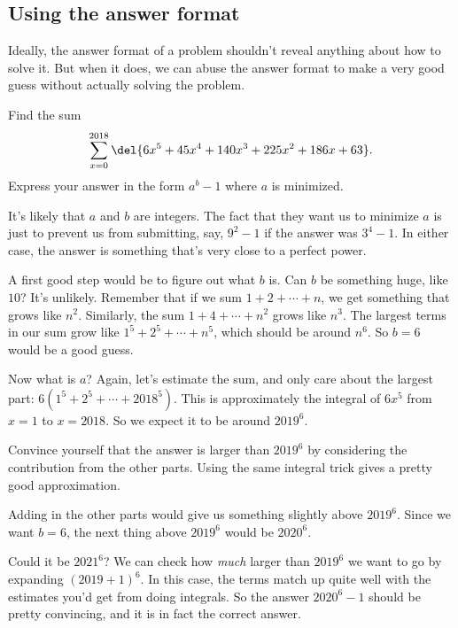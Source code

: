 \documentclass[11pt,paper=letter]{scrartcl}
\begin{document}
\subsection{Using the answer format}

Ideally, the answer format of a problem shouldn't reveal anything about how to solve it. But when it does, we can abuse the answer format to make a very good guess without actually solving the problem.

\begin{exboxed}
  \label{ex:sipnayan}
  Find the sum $$\displaystyle \sum_{x = 0}^{2018} \del{6x^5 + 45 x^4 + 140x^3 + 225 x^2 + 186x + 63}.$$ Express your answer in the form $a^b - 1$ where $a$ is minimized. %
\end{exboxed}

It's likely that $a$ and $b$ are integers. The fact that they want us to minimize $a$ is just to prevent us from submitting, say, $9^2 - 1$ if the answer was $3^4 - 1$. In either case, the answer is something that's very close to a perfect power.

A first good step would be to figure out what $b$ is. Can $b$ be something huge, like $10$? It's unlikely. Remember that if we sum $1 + 2 + \cdots + n$, we get something that grows like $n^2$. Similarly, the sum $1 + 4 + \cdots + n^2$ grows like $n^3$. The largest terms in our sum grow like $1^5 + 2^5 + \cdots + n^5$, which should be around $n^6$. So $b = 6$ would be a good guess.

Now what is $a$? Again, let's estimate the sum, and only care about the largest part: $6\left(1^5 + 2^5 + \cdots + 2018^5\right)$. This is approximately the integral of $6x^5$ from $x = 1$ to $x = 2018$. So we expect it to be around $2019^6$.

\begin{exrboxed}
  Convince yourself that the answer is larger than $2019^6$ by considering the contribution from the other parts. Using the same integral trick gives a pretty good approximation.
\end{exrboxed}

Adding in the other parts would give us something slightly above $2019^6$. Since we want $b = 6$, the next thing above $2019^6$ would be $2020^6$.

Could it be $2021^6$? We can check how \textit{much} larger than $2019^6$ we want to go by expanding $(2019 + 1)^6$. In this case, the terms match up quite well with the estimates you'd get from doing integrals. So the answer $2020^6 - 1$ should be pretty convincing, and it is in fact the correct answer.
\end{document}

